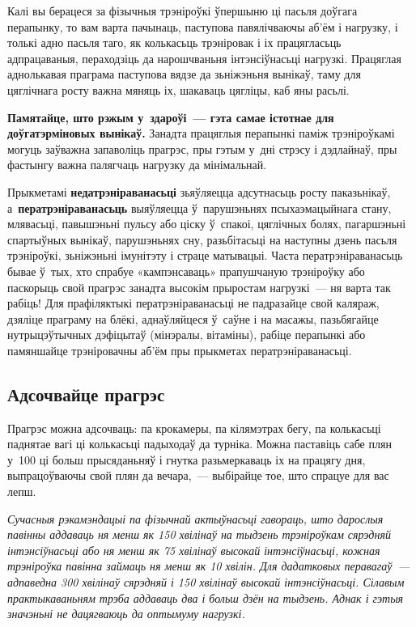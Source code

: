 Калі вы берацеся за фізычныя трэніроўкі ўпершыню ці пасьля доўгага перапынку, то вам варта пачынаць, паступова павялічваючы аб'ём і нагрузку, і толькі адно пасьля таго, як колькасьць трэніровак і іх працягласьць адпрацаваныя, пераходзіць да нарошчваньня інтэнсіўнасьці нагрузкі. Працяглая аднолькавая праграма паступова вядзе да зьніжэньня вынікаў, таму для цяглічнага росту важна мяняць іх, шакаваць цягліцы, каб яны расьлі. 

\textbf{Памятайце, што рэжым у~здароўі~--- гэта самае істотнае для доўгатэрміновых вынікаў.} Занадта працяглыя перапынкі паміж трэніроўкамі могуць заўважна запаволіць прагрэс, пры гэтым у~дні стрэсу і дэдлайнаў, пры фастынгу важна палягчаць нагрузку да мінімальнай.

Прыкметамі \textbf{недатрэніраванасьці} зьяўляецца адсутнасьць росту паказьнікаў, а~\textbf{ператрэніраванасьць} выяўляецца ў~парушэньнях псыхаэмацыйнага стану, млявасьці, павышэньні пульсу або ціску ў~спакоі, цяглічных болях, пагаршэньні спартыўных вынікаў, парушэньнях сну, разьбітасьці на наступны дзень пасьля трэніроўкі, зьніжэньні імунітэту і страце матывацыі. Часта ператрэніраванасьць бывае ў~тых, хто спрабуе «кампэнсаваць» прапушчаную трэніроўку або паскорыць свой прагрэс занадта высокім прыростам нагрузкі~--- ня варта так рабіць! Для прафіляктыкі ператрэніраванасьці не падразайце свой каляраж, дзяліце праграму на блёкі, аднаўляйцеся ў~саўне і на масажы, пазьбягайце нутрыцэўтычных дэфіцытаў (мінэралы, вітаміны), рабіце перапынкі або памяншайце трэніровачны аб'ём пры прыкметах ператрэніраванасьці.

\subsection*{Адсочвайце прагрэс}

Прагрэс можна адсочваць: па крокамеры, па кілямэтрах бегу, па колькасьці паднятае вагі ці колькасьці падыходаў да турніка. Можна паставіць сабе плян у~100 ці больш прысяданьняў і гнутка разьмеркаваць іх на працягу дня, выпрацоўваючы свой плян да вечара,~--- выбірайце тое, што спрацуе для вас лепш. 


\emph{Сучасныя рэкамэндацыі па фізычнай актыўнасьці гавораць, што дарослыя павінны аддаваць ня менш як 150 хвілінаў на тыдзень трэніроўкам сярэдняй інтэнсіўнасьці або ня менш як 75 хвілінаў высокай інтэнсіўнасьці, кожная трэніроўка павінна займаць ня менш як 10 хвілін. Для дадатковых перавагаў~--- адпаведна 300 хвілінаў сярэдняй і 150 хвілінаў высокай інтэнсіўнасьці. Сілавым практыкаваньням трэба аддаваць два і больш дзён на тыдзень. Аднак і гэтыя значэньні не дацягваюць да оптымуму нагрузкі.}

